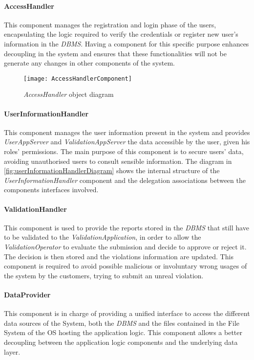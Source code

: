 \paragraph{AccessHandler}
This component manages the registration and login phase of the users, encapsulating the logic required to verify the credentials or register new user's information in the \textit{DBMS}. Having a component for this specific purpose enhances decoupling in the system and ensures that these functionalities will not be generate any changes in other components of the system.\newline\newline
\begin{figure}[h!]
	\centering
	\texttt{[image: AccessHandlerComponent]}
	\caption{
		\label{fig:accessHandlerComponentDiagram} 
		\emph{AccessHandler} object diagram
	}
\end{figure}
\paragraph{UserInformationHandler}
This component manages the user information present in the system and provides \textit{UserAppServer} and \textit{ValidationAppServer} the data accessible by the user, given his roles' permissions. The main purpose of this component is to secure users' data, avoiding unauthorised users to consult sensible information. The diagram in \autoref{fig:userInformationHandlerDiagram} shows the internal structure of the \textit{UserInformationHandler} component and the delegation associations between the components interfaces involved.
\paragraph{ValidationHandler}
This component is used to provide the reports stored in the \textit{DBMS} that still have to be validated to the \textit{ValidationApplication}, in order to allow the \textit{ValidationOperator} to evaluate the submission and decide to approve or reject it. The decision is then stored and the violations information are updated. This component is required to avoid possible malicious or involuntary wrong usages of the system by the customers, trying to submit an unreal violation.
\paragraph{DataProvider}
This component is in charge of providing a unified interface to access the different data sources of the System, both the \textit{DBMS} and the files contained in the File System of the OS hosting the application logic. This component allows a better decoupling between the application logic components and the underlying data layer. 
